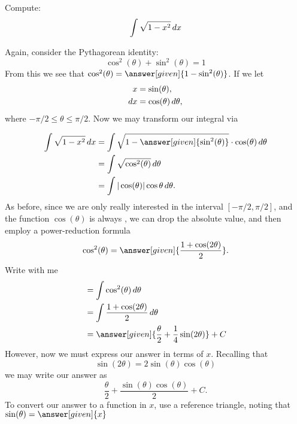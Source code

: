 \documentclass{ximera}
\begin{document}
\begin{example}
  Compute:
  \[
  \int \sqrt{1-x^2} \mathop{}\!d x
  \]
  \begin{explanation}
    Again, consider the Pythagorean identity:
    \[
    \cos^2(\theta) + \sin^2(\theta) = 1
    \]
    From this we see that $\cos^2(\theta)=
    \answer[given]{1-\sin^2(\theta)}$.  If we let
    \begin{align*}
      x &=\sin(\theta),\\
      \mathop{}\!d x &= \cos(\theta) \mathop{}\!d\theta,
    \end{align*}
    where $-\pi/2\le\theta\le \pi/2$.  Now we may transform our
    integral via
    \begin{image}
    \end{image}
    \begin{align*}
      \int \sqrt{1-x^2} \d x &= \int \sqrt{1-\answer[given]{\sin^2(\theta)}} \cdot \cos(\theta) \d \theta \\
      &= \int \sqrt{\cos^2(\theta)}\d\theta \\
      &=\int |\cos(\theta)| \cos\theta \d\theta.
    \end{align*}
    As before, since we are only really interested in the interval
    $[-\pi/2,\pi/2]$, and the function $\cos(\theta)$ is always
    ,
    we can drop the absolute value, and then employ a power-reduction
    formula
    \[
    \cos^2(\theta)= \answer[given]{\frac{1+\cos(2\theta)}{2}}.
    \]
    Write with me
    \begin{align*}
      &= \int \cos^2(\theta) \d \theta \\
      &= \int \frac{1+\cos(2\theta)}{2} \d \theta\\
      &= \answer[given]{\frac{\theta}{2} +\frac{1}{4}\sin(2\theta)}+C
    \end{align*}
    However, now we must express our answer in terms of $x$. Recalling that
    \[
    \sin(2\theta) = 2\sin(\theta)\cos(\theta)
    \]
    we may write our answer as
    \[
    \frac{\theta}{2} +\frac{\sin(\theta)\cos(\theta)}{2}+C.
    \]
    To convert our answer to a function in $x$, use a reference triangle, noting that $\sin(\theta) = \answer[given]{x}$

\end{explanation}
\end{example}
\end{document}

